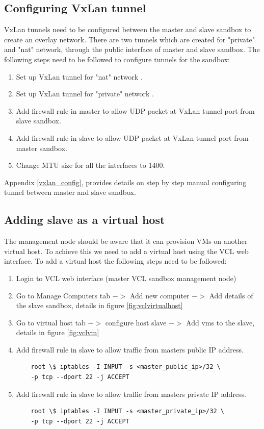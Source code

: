\documentclass[12pt]{extarticle}
\begin{document}
\subsection{Configuring VxLan tunnel}

VxLan tunnels need to be configured between the master and slave sandbox to create an overlay network. There are two tunnels which are created for "private" and "nat" network, through the public interface of master and slave sandbox. The following steps need to be followed to configure tunnels for the sandbox:
\begin{enumerate}
    \item Set up VxLan tunnel for "nat" network \cite{vxlan}.
    \item Set up VxLan tunnel for "private" network \cite{vxlan}.
    \item Add firewall rule in master to allow UDP packet at VxLan tunnel port from slave sandbox.
    \item Add firewall rule in slave to allow UDP packet at VxLan tunnel port from master sandbox.
    \item Change MTU size for all the interfaces to 1400.
\end{enumerate}
Appendix \ref{vxlan_config}, provides details on step by step manual configuring tunnel between master and slave sandbox.

\subsection{Adding slave as a virtual host}
The management node should be aware that it can provision VMs on another virtual host. To achieve this we need to add a virtual host using the VCL web interface. To add a virtual host the following steps need to be followed:

\begin{enumerate}
    \item Login to VCL web interface (master VCL sandbox management node)
    \item Go to Manage Computers tab $->$ Add new computer $->$ Add details of the slave sandbox, details in figure \ref{fig:vclvirtualhost}
    \item Go to virtual host tab $->$ configure host slave $->$ Add vms to the slave, details in figure \ref{fig:vclvm}
    \item Add firewall rule in slave to allow traffic from masters public IP address.
    \begin{verbatim}
    root \$ iptables -I INPUT -s <master_public_ip>/32 \
    -p tcp --dport 22 -j ACCEPT
    \end{verbatim}
    \item Add firewall rule in slave to allow traffic from masters private IP address.
    \begin{verbatim}
    root \$ iptables -I INPUT -s <master_private_ip>/32 \
    -p tcp --dport 22 -j ACCEPT
    \end{verbatim}
\end{enumerate}
\end{document}

